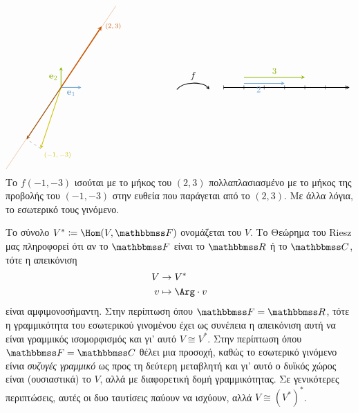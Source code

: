 \documentclass[12pt,a4paper,reqno]{amsart}
\newcommand{\defn}[1]{{\color{mylightblue}{#1}}}
\begin{document}
\begin{digression_la}
\[\begin{tikzpicture}[scale=0.8,>=stealth]
\begin{scope}[shift={(0,0)}]
    \draw[->,thick,iceberg] (0,0) -- (1,0) node[midway,below] {$\bfe_1$};
    \draw[->,thick,applegreen] (0,0) -- (0,1) node[midway,left] {$\bfe_2$};

    \draw[thin,burntorange!60] (-2.7,-4) -- (2.7,4); %
    \draw[->,very thick,burntorange] (0,0) -- (2,3) node[right] {\scriptsize{$(2,3)$}};

    \draw[->,thick,canaryyellow!80!black] (0,0) -- (-1,-3) node[below right] {\scriptsize{$(-1,-3)$}};

    \coordinate (proj) at (-1.69,-2.54);
    \draw[dashed,gray] (-1,-3) -- (proj); %
    \draw[->,thick,orange!60!black] (0,0) -- (proj) node {};
\end{scope}

\begin{scope}[shift={(4,-.4)}]
    \draw[->, thick]
        (1.7,0.3) .. controls (2,0.7) and (3,0.7) .. (3.3,0.3)
        node[midway, above] {$f$};
\end{scope}

\begin{scope}[shift={(9,0)}]
    \draw[step=1cm,gray!40,thin] (-1,0) grid (5,0);
    \draw[thick,->] (-1,0) -- (5.2,0) node {};

    \foreach \x in {-1,0,1,2,3,4,5}
        \draw (\x,0.1) -- (\x,-0.1);

    \draw[->,thick,iceberg] (0,0.2) -- (2,0.2) node[midway,below left] {$2$};
    \draw[->,thick,applegreen] (0,0.5) -- (3,0.5) node[midway,above] {$3$};
\end{scope}
\end{tikzpicture}
\]
Το $f(-1,-3)$ ισούται με το μήκος του $(2,3)$ πολλαπλασιασμένο με το μήκος της προβολής του $(-1,-3)$ στην ευθεία που παράγεται από το $(2,3)$. Με άλλα λόγια, το εσωτερικό τους γινόμενο.

Το σύνολο $V^\ast \coloneqq \Hom(V,\FF)$ ονομάζεται \defn{δυϊκός χώρος} του $V$. Το Θεώρημα του Riesz μας πληροφορεί ότι αν το $\FF$ είναι το $\RR$ ή το $\CC$, τότε η απεικόνιση 
\begin{align*}
    V &\to V^\ast \\
    v &\mapsto \Arg \cdot v
\end{align*}
είναι αμφιμονοσήμαντη. Στην περίπτωση όπου $\FF = \RR$, τότε η γραμμικότητα του εσωτερικού γινομένου έχει ως συνέπεια η απεικόνιση αυτή να είναι γραμμικός ισομορφισμός και γι' αυτό $V \cong V^\ast$. Στην περίπτωση όπου $\FF = \CC$ θέλει μια προσοχή, καθώς το εσωτερικό γινόμενο είνια \emph{συζυγές γραμμικό} ως προς τη δεύτερη μεταβλητή και γι' αυτό ο δυϊκός χώρος είναι (ουσιαστικά) το $V$, αλλά με διαφορετική δομή γραμμικότητας. Σε γενικότερες περιπτώσεις, αυτές οι δυο ταυτίσεις παύουν να ισχύουν, αλλά $V \cong \left(V^\ast\right)^\ast$.


\end{digression_la}
\end{document}
